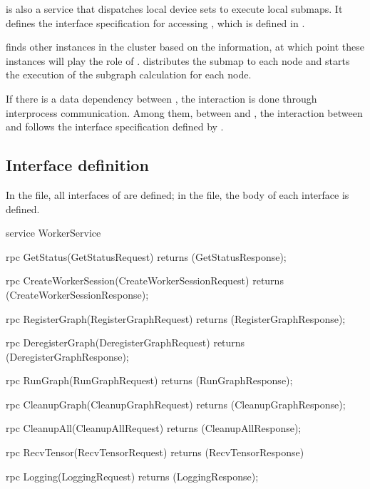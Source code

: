 \begin{content}
 is also a  service that dispatches local device sets to execute local submaps. It defines the interface specification for accessing , which is defined in .

 finds other  instances in the cluster based on the  information, at which point these  instances will play the role of .  distributes the submap to each  node and starts the execution of the subgraph calculation for each  node.

If there is a data dependency between , the interaction is done through interprocess communication. Among them, between  and , the interaction between  and  follows the interface specification defined by .


\subsection{Interface definition}
In the  file, all interfaces of  are defined; in the  file, the body of each interface is defined.

\begin{leftbar}
\begin{c++}
service WorkerService {
  rpc GetStatus(GetStatusRequest) 
      returns (GetStatusResponse);

  rpc CreateWorkerSession(CreateWorkerSessionRequest)
      returns (CreateWorkerSessionResponse);

  rpc RegisterGraph(RegisterGraphRequest) 
      returns (RegisterGraphResponse);

  rpc DeregisterGraph(DeregisterGraphRequest) 
      returns (DeregisterGraphResponse);

  rpc RunGraph(RunGraphRequest) 
      returns (RunGraphResponse);

  rpc CleanupGraph(CleanupGraphRequest) 
      returns (CleanupGraphResponse);

  rpc CleanupAll(CleanupAllRequest) 
      returns (CleanupAllResponse);

  rpc RecvTensor(RecvTensorRequest) 
      returns (RecvTensorResponse) {
  }

  rpc Logging(LoggingRequest) 
      returns (LoggingResponse);

}
\end{c++}
\end{leftbar}
\end{content}
